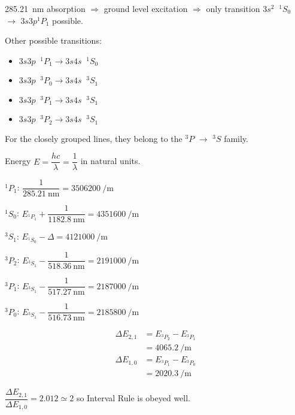 \begin{parts}
	\SI{285.21}{\nano\metre} absorption $\Rightarrow$ ground level excitation $\Rightarrow$ only transition $3s^2 \;\; {}^1 S_0$ $\to$ $3s3p {}^1 P_1$ possible.
	
	Other possible transitions:
	\begin{itemize}
		\item $3s3p \;\; {}^1 P_1 \to 3s4s \;\; {}^1 S_0$
		\item $3s3p \;\; {}^3 P_0 \to 3s4s \;\; {}^3 S_1$
		\item $3s3p \;\; {}^3 P_1 \to 3s4s \;\; {}^3 S_1$
		\item $3s3p \;\; {}^3 P_2 \to 3s4s \;\; {}^3 S_1$
	\end{itemize}
	
	For the closely grouped lines, they belong to the ${}^3 P$ $\to$ ${}^3 S$ family.
	
	Energy $E = \dfrac{hc}{\lambda} = \dfrac{1}{\lambda}$ in natural units.
	
	${}^1 P_1$: $\dfrac{1}{\SI{285.21}{\nano\metre}} = \SI{3506200}{\per\metre}$
	
	${}^1 S_0$: $E_{{}^1 P_1} + \dfrac{1}{\SI{1182.8}{\nano\metre}} = \SI{4351600}{\per\metre}$
	
	${}^3 S_1$: $E_{{}^1 S_0} - \Delta = \SI{4121000}{\per\metre}$
	
	${}^3 P_2$: $E_{{}^3 S_1} - \dfrac{1}{\SI{518.36}{\nano\metre}} = \SI{2191000}{\per\metre}$
	
	${}^3 P_1$: $E_{{}^3 S_1} - \dfrac{1}{\SI{517.27}{\nano\metre}} = \SI{2187000}{\per\metre}$
	
	${}^3 P_0$: $E_{{}^3 S_1} - \dfrac{1}{\SI{516.73}{\nano\metre}} = \SI{2185800}{\per\metre}$
	
	\begin{align*}
		\Delta E_{2, 1} &= E_{{}^3 P_2} - E_{{}^3 P_1} \\
		&= \SI{4065.2}{\per\metre} \\[1em]
		\Delta E_{1, 0} &= E_{{}^3 P_1} - E_{{}^3 P_0} \\
		&= \SI{2020.3}{\per\metre}
	\end{align*}
	
	$\dfrac{\Delta E_{2, 1}}{\Delta E_{1, 0}} = \num{2.012} \simeq 2$ so Interval Rule is obeyed well.
	

\end{parts}
